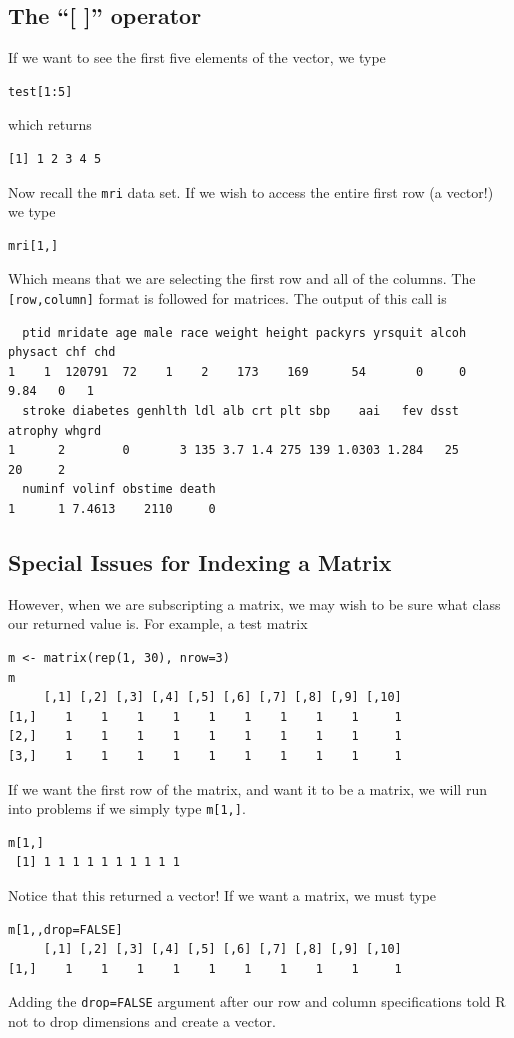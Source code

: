 \documentclass[11pt,letterpaper,fleqn]{report}
\begin{document}
\subsection{The ``[ ]'' operator}
If we want to see the first five elements of the vector, we type
\begin{verbatim}
test[1:5]
\end{verbatim}
which returns
\begin{verbatim}
[1] 1 2 3 4 5 
\end{verbatim}
Now recall the \texttt{mri} data set. If we wish to access the entire first row (a vector!) we type 
\begin{verbatim}
mri[1,]
\end{verbatim}
Which means that we are selecting the first row and all of the columns. The \texttt{[row,column]} format is followed for matrices. The output of this call is 
\begin{verbatim}
  ptid mridate age male race weight height packyrs yrsquit alcoh physact chf chd
1    1  120791  72    1    2    173    169      54       0     0    9.84   0   1
  stroke diabetes genhlth ldl alb crt plt sbp    aai   fev dsst atrophy whgrd
1      2        0       3 135 3.7 1.4 275 139 1.0303 1.284   25      20     2
  numinf volinf obstime death
1      1 7.4613    2110     0
\end{verbatim}

\subsection{Special Issues for Indexing a Matrix}
However, when we are subscripting a matrix, we may wish to be sure what class our returned value is. For example, a test matrix
\begin{verbatim}
m <- matrix(rep(1, 30), nrow=3)
m
     [,1] [,2] [,3] [,4] [,5] [,6] [,7] [,8] [,9] [,10]
[1,]    1    1    1    1    1    1    1    1    1     1
[2,]    1    1    1    1    1    1    1    1    1     1
[3,]    1    1    1    1    1    1    1    1    1     1
\end{verbatim}
If we want the first row of the matrix, and want it to be a matrix, we will run into problems if we simply type \texttt{m[1,]}. 
\begin{verbatim}
m[1,]
 [1] 1 1 1 1 1 1 1 1 1 1
\end{verbatim}
Notice that this returned a vector! If we want a matrix, we must type
\begin{verbatim}
m[1,,drop=FALSE]
     [,1] [,2] [,3] [,4] [,5] [,6] [,7] [,8] [,9] [,10]
[1,]    1    1    1    1    1    1    1    1    1     1
\end{verbatim}
Adding the \texttt{drop=FALSE} argument after our row and column specifications told R not to drop dimensions and create a vector.
\end{document}
